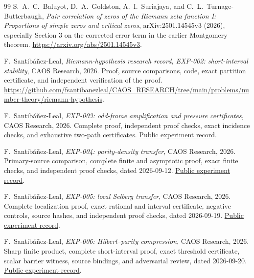 \documentclass[11pt]{article}
\theoremstyle{remark}
\begin{document}
\begin{thebibliography}{99}
S.~A.~C.~Baluyot, D.~A.~Goldston, A.~I.~Suriajaya, and C.~L.~Turnage-Butterbaugh,
\emph{Pair correlation of zeros of the Riemann zeta function I:
Proportions of simple zeros and critical zeros},
arXiv:2501.14545v3 (2026), especially Section 3 on the
corrected error term in the earlier Montgomery theorem.
\url{https://arxiv.org/abs/2501.14545v3}.

F.~Santib\'a\~nez-Leal,
\emph{Riemann-hypothesis research record, EXP-002: short-interval
stability}, CAOS Research, 2026. Proof, source comparisons, code, exact
partition certificate, and independent verification of the proof.
\url{https://github.com/fsantibanezleal/CAOS_RESEARCH/tree/main/problems/number-theory/riemann-hypothesis}.

F.~Santib\'a\~nez-Leal,
\emph{EXP-003: odd-frame amplification and pressure certificates},
CAOS Research, 2026. Complete proof, independent proof checks, exact
incidence checks, and exhaustive two-path certificates.
\href{https://github.com/fsantibanezleal/CAOS_RESEARCH/tree/main/problems/number-theory/riemann-hypothesis/experiments/EXP-003-odd-frame-pressure}{Public experiment record}.

F.~Santib\'a\~nez-Leal,
\emph{EXP-004: parity-density transfer}, CAOS Research, 2026.
Primary-source comparison, complete finite and asymptotic proof, exact
finite checks, and independent proof checks, dated 2026-09-12.
\href{https://github.com/fsantibanezleal/CAOS_RESEARCH/tree/main/problems/number-theory/riemann-hypothesis/experiments/EXP-004-parity-density-transfer}{Public experiment record}.

F.~Santib\'a\~nez-Leal,
\emph{EXP-005: local Selberg transfer}, CAOS Research, 2026.
Complete localization proof, exact rational and interval certificate,
negative controls, source hashes, and independent proof checks, dated
2026-09-19.
\href{https://github.com/fsantibanezleal/CAOS_RESEARCH/tree/main/problems/number-theory/riemann-hypothesis/experiments/EXP-005-local-selberg-transfer}{Public experiment record}.

F.~Santib\'a\~nez-Leal,
\emph{EXP-006: Hilbert--parity compression}, CAOS Research, 2026.
Sharp finite product, complete short-interval proof, exact threshold
certificate, scalar barrier witness, source bindings, and adversarial review,
dated 2026-09-20.
\href{https://github.com/fsantibanezleal/CAOS_RESEARCH/tree/main/problems/number-theory/riemann-hypothesis/experiments/EXP-006-hilbert-parity-compression}{Public experiment record}.

\end{thebibliography}
\end{document}
